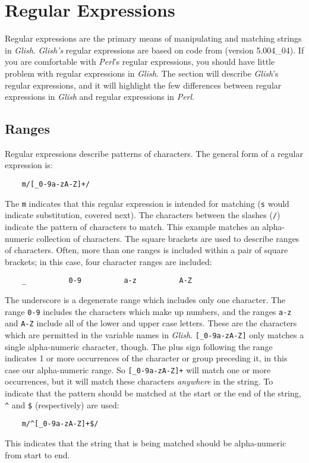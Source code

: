 \section{Regular Expressions}
\label{regular-exprs}

Regular expressions are the primary means of manipulating and matching strings
in {\em Glish}. {\em Glish's} regular expressions are based on code from
(version 5.004\_04). If you are comfortable with {\em Perl}'s regular expressions, you
should have little problem with regular expressions in {\em Glish}. The section will
describe {\em Glish}'s regular expressions, and it will highlight the few differences
between regular expressions in {\em Glish} and regular expressions in {\em Perl}.

\subsection{Ranges}
Regular expressions describe patterns of characters. The general form of a regular
expression is:
\begin{verbatim}
    m/[_0-9a-zA-Z]+/
\end{verbatim}
The \verb+m+ indicates that this regular expression is intended for matching
(\verb+s+ would indicate substitution, covered next). The characters between the
slashes (\verb+/+) indicate the pattern of characters to match. This example matches
an alpha-numeric collection of characters. The square brackets are
used to describe ranges of characters. Often, more than one ranges is included within
a pair of square brackets; in this case, four character ranges are included:
\begin{verbatim}
    _          0-9          a-z          A-Z
\end{verbatim}
The underscore is a degenerate range which includes only one character.
The range \verb+0-9+ includes the characters which make up numbers, and the
ranges \verb+a-z+ and \verb+A-Z+ include all of the lower and upper case letters.
These are the characters which are permitted in the variable names in {\em Glish}.
\verb+[_0-9a-zA-Z]+ only matches a single alpha-numeric character,
though.  The plus sign following the
range indicates 1 or more occurrences of the character or group preceding it, in
this case our alpha-numeric range. So \verb|[_0-9a-zA-Z]+| will match one or more
occurrences, but it will match these characters {\em anywhere} in the string. To
indicate 
that the pattern should be matched at the start or the end of the string,
\verb+^+ and \verb+$+ (respectively) are used:
\begin{verbatim}
    m/^[_0-9a-zA-Z]+$/
\end{verbatim}
This indicates that the string that is being matched should be alpha-numeric
from start to end.

